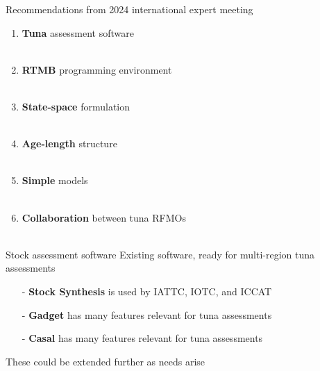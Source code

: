 \documentclass[aspectratio=169,fleqn]{beamer}
\begin{document}
\begin{frame}{Recommendations from 2024 international expert meeting}
  \begin{enumerate}
    \item {\darkgreen\bf Tuna} assessment software\\
    \\[1ex]
    \item {\darkgreen\bf RTMB} programming environment\\
    \\[1ex]
    \item {\darkgreen\bf State-space} formulation\\
    \\[1ex]
    \item {\darkgreen\bf Age-length} structure\\
    \\[1ex]
    \item {\darkgreen\bf Simple} models\\
    \\[1ex]
    \item {\darkgreen\bf Collaboration} between tuna RFMOs\\
    \\[1.5ex]
  \end{enumerate}
\end{frame}


\begin{frame}{Stock assessment software}
  Existing software, ready for multi-region tuna assessments\\[3ex]
  \begin{itemize}
    \item[-] {\darkgreen\bf Stock Synthesis} is used by IATTC, IOTC, and
    ICCAT\\[3ex]
    \item[-] {\darkgreen\bf Gadget} has many features relevant for tuna
    assessments\\[3ex]
    \item[-] {\darkgreen\bf Casal} has many features relevant for tuna
    assessments\\[4ex]
  \end{itemize}
  These could be extended further as needs arise\\[2ex]
\end{frame}
\end{document}
